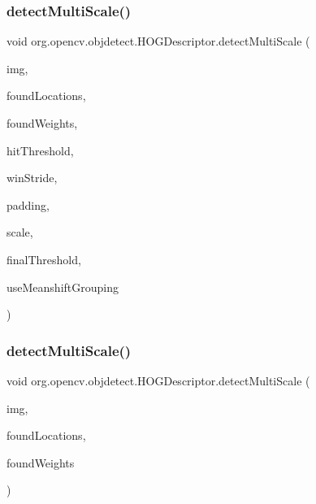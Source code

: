 \subsubsection{\texorpdfstring{detect\+Multi\+Scale()}{detectMultiScale()}\hspace{0.1cm}{\footnotesize\ttfamily [1/2]}}
{\footnotesize\ttfamily void org.\+opencv.\+objdetect.\+H\+O\+G\+Descriptor.\+detect\+Multi\+Scale (\begin{DoxyParamCaption}\item[{\mbox{\hyperlink{classorg_1_1opencv_1_1core_1_1_mat}{Mat}}}]{img,  }\item[{\mbox{\hyperlink{classorg_1_1opencv_1_1core_1_1_mat_of_rect}{Mat\+Of\+Rect}}}]{found\+Locations,  }\item[{\mbox{\hyperlink{classorg_1_1opencv_1_1core_1_1_mat_of_double}{Mat\+Of\+Double}}}]{found\+Weights,  }\item[{double}]{hit\+Threshold,  }\item[{\mbox{\hyperlink{classorg_1_1opencv_1_1core_1_1_size}{Size}}}]{win\+Stride,  }\item[{\mbox{\hyperlink{classorg_1_1opencv_1_1core_1_1_size}{Size}}}]{padding,  }\item[{double}]{scale,  }\item[{double}]{final\+Threshold,  }\item[{boolean}]{use\+Meanshift\+Grouping }\end{DoxyParamCaption})}

\mbox{\label{classorg_1_1opencv_1_1objdetect_1_1_h_o_g_descriptor_a0792b6a9193c0bddb4d8a33b54c466f1}} 
\subsubsection{\texorpdfstring{detect\+Multi\+Scale()}{detectMultiScale()}\hspace{0.1cm}{\footnotesize\ttfamily [2/2]}}
{\footnotesize\ttfamily void org.\+opencv.\+objdetect.\+H\+O\+G\+Descriptor.\+detect\+Multi\+Scale (\begin{DoxyParamCaption}\item[{\mbox{\hyperlink{classorg_1_1opencv_1_1core_1_1_mat}{Mat}}}]{img,  }\item[{\mbox{\hyperlink{classorg_1_1opencv_1_1core_1_1_mat_of_rect}{Mat\+Of\+Rect}}}]{found\+Locations,  }\item[{\mbox{\hyperlink{classorg_1_1opencv_1_1core_1_1_mat_of_double}{Mat\+Of\+Double}}}]{found\+Weights }\end{DoxyParamCaption})}


